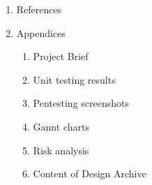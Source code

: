 \begin{enumerate}
	\item References
	
	\item Appendices
	\begin{enumerate}
		\item Project Brief
		\item Unit testing results
		\item Pentesting screenshots
		\item Gannt charts
		\item Risk analysis
		\item Content of Design Archive
	\end{enumerate}
  
\end{enumerate}


